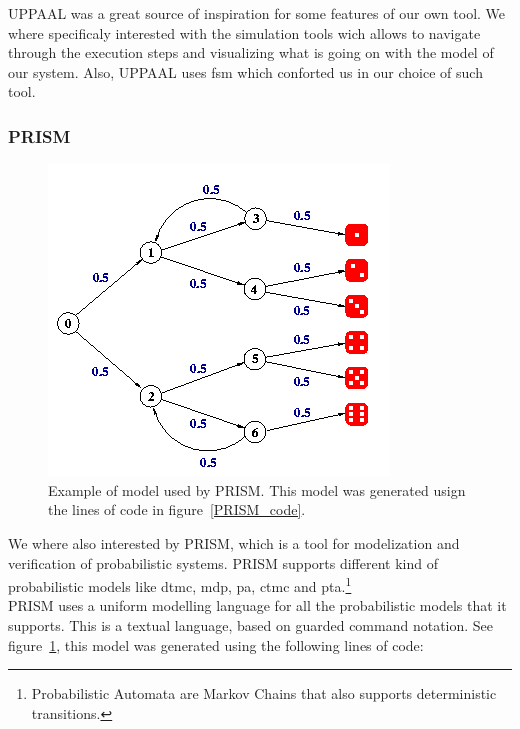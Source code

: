 \documentclass[12pt]{article}
\begin{document}
UPPAAL was a great source of inspiration for some features of our own tool. We where specificaly interested with the simulation tools wich allows to navigate through the execution steps and visualizing what is going on with the model of our system. Also, UPPAAL uses \gls{fsm} which conforted us in our choice of such tool.\\

\subsubsection{PRISM}

\begin{figure}
    \centering
    \includegraphics[scale=0.6]{PRISM_model.png}
    \caption{Example of model used by PRISM. This model was generated usign the lines of code in figure~\ref{PRISM_code}.}
    \label{PRISM_model}
\end{figure}

We where also interested by PRISM, which is a tool for modelization and verification of probabilistic systems. PRISM supports different kind of probabilistic models like \gls{dtmc}, \gls{mdp}, \gls{pa}, \gls{ctmc} and \gls{pta}.\footnote{Probabilistic Automata are Markov Chains that also supports deterministic transitions.}~\cite{Kwiatkowska2011}~\cite{Hinton2006}\\

PRISM uses a uniform modelling language for all the probabilistic models that it supports. This is a textual language, based on guarded command notation. See figure~\ref{PRISM_model}, this model was generated using the following lines of code:
\end{document}
